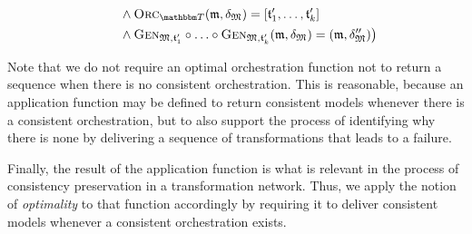 \begin{definition}
\begin{align*}
            & \formulaskip \formulaskip
            \land \orcfunction{\transformationset{T}}(\modeltuple{m}, \changetuple{\metamodeltuple{M}}) = \sequenced{\transformation{t}_{1}', \dots, \transformation{t}_{k}'} \\
            & \formulaskip \formulaskip
            \land \generalizationfunction{\metamodeltuple{M},\transformation{t}_{1}'} \concatfunction \dots \concatfunction \generalizationfunction{\metamodeltuple{M},\transformation{t}_{k}'}(\modeltuple{m}, \changetuple{\metamodeltuple{M}}) = (\modeltuple{m}, \changetuple{\metamodeltuple{M}}'') %
        \bigr) %
    \end{align*}
\end{definition}

Note that we do not require an optimal orchestration function not to return a sequence when there is no consistent orchestration.
This is reasonable, because an application function may be defined to return consistent models whenever there is a consistent orchestration, but to also support the process of identifying why there is none by delivering a sequence of transformations that leads to a failure.

Finally, the result of the application function is what is relevant in the process of consistency preservation in a transformation network.
Thus, we apply the notion of \emph{optimality} to that function accordingly by requiring it to deliver consistent models whenever a consistent orchestration exists.

